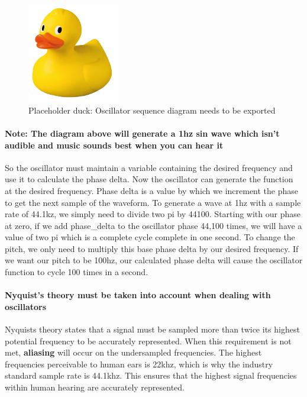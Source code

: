 \documentclass[acmlarge,screen]{acmart}
\begin{document}
	\begin{figure}[H]
		\includegraphics[width=4cm]{placeholder_duck}
		\caption{Placeholder duck: Oscillator sequence diagram needs to be exported}
		\centering
	\end{figure}

	\paragraph{Note: The diagram above will generate a 1hz sin wave which isn't audible and music sounds best when you can hear it} So the oscillator must maintain a variable containing the desired frequency and use it to calculate the phase delta. Now the oscillator can generate the function at the desired frequency. Phase delta is a value by which we increment the phase to get the next sample of the waveform. To generate a wave at 1hz with a sample rate of 44.1kz, we simply need to divide two pi by 44100. Starting with our phase at zero, if we add phase\_delta to the oscillator phase 44,100 times, we will have a value of two pi which is a complete cycle complete in one second. To change the pitch, we only need to multiply this base phase delta by our desired frequency. If we want our pitch to be 100hz, our calculated phase delta will cause the oscillator function to cycle 100 times in a second. 
	
	\paragraph{\textbf{Nyquist's theory} must be taken into account when dealing with oscillators} Nyquists theory states that a signal must be sampled more than twice its highest potential frequency to be accurately represented. When this requirement is not met, \textbf{aliasing} will occur on the undersampled frequencies. The highest frequencies perceivable to human ears is 22khz, which is why the industry standard sample rate is 44.1khz. This ensures that the highest signal frequencies within human hearing are accurately represented.
\end{document}
